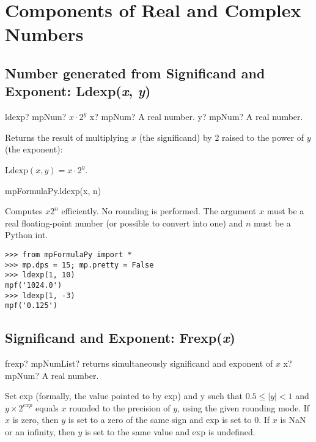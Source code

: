 \newpage
\section{Components of Real and Complex Numbers}


\subsection{Number generated from Significand and Exponent: Ldexp(\textit{x}, \textit{y})}

\begin{mpFunctionsExtract}
	\mpFunctionTwo
	{ldexp? mpNum? $x \cdot 2^{y}$}
	{x? mpNum? A real number.}
	{y? mpNum? A real number.}
\end{mpFunctionsExtract}

\vspace{0.3cm}
Returns the result of multiplying $x$ (the significand) by 2 raised to the power of $y$ (the exponent): 

$\text{Ldexp}(x,y) = x \cdot 2^{y}$.



mpFormulaPy.ldexp(x, n)

\vpara
Computes $x2^n$ efficiently. No rounding is performed. The argument $x$ must be a real floating-point number (or possible to convert into one) and $n$ must be a Python int.

\begin{lstlisting}
>>> from mpFormulaPy import *
>>> mp.dps = 15; mp.pretty = False
>>> ldexp(1, 10)
mpf('1024.0')
>>> ldexp(1, -3)
mpf('0.125')
\end{lstlisting}


\subsection{Significand and Exponent: Frexp(\textit{x})}

\begin{mpFunctionsExtract}
	\mpFunctionOne
	{frexp? mpNumList? returns simultaneously significand and exponent of $x$}
	{x? mpNum? A real number.}
\end{mpFunctionsExtract}

\vspace{0.3cm}
Set exp (formally, the value pointed to by exp) and y such that $0.5 \leq |y| < 1$ and $y \times 2^{exp}$ equals $x$ rounded to the precision of $y$, using the given rounding mode. If $x$ is zero, then $y$ is set to a zero of the same sign and exp is set to 0. If $x$ is NaN or an infinity, then $y$ is set to the same value and exp is undefined.

